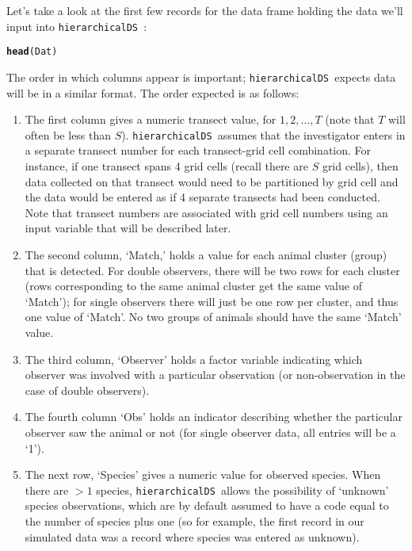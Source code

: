 \documentclass{article}\usepackage{graphicx, color}
\makeatletter
\newcommand{\hlfunctioncall}[1]{\textcolor[rgb]{0.501960784313725,0,0.329411764705882}{\textbf{#1}}}%
\newenvironment{kframe}{%
 \def\at@end@of@kframe{}%
 \ifinner\ifhmode%
  \def\at@end@of@kframe{\end{minipage}}%
  \begin{minipage}{\columnwidth}%
 \fi\fi%
 \def\FrameCommand##1{\hskip\@totalleftmargin \hskip-\fboxsep
 \colorbox{shadecolor}{##1}\hskip-\fboxsep
     \hskip-\linewidth \hskip-\@totalleftmargin \hskip\columnwidth}%
 \MakeFramed {\advance\hsize-\width
   \@totalleftmargin\z@ \linewidth\hsize
   \@setminipage}}%
 {\par\unskip\endMakeFramed%
 \at@end@of@kframe}
\newenvironment{knitrout}{}{} %
\newcommand{\hDS}{\texttt{hierarchicalDS }}
\makeatother
\begin{document}
Let's take a look at the first few records for the data frame holding the data
we'll input into \hDS:
\begin{knitrout}
\color{fgcolor}\begin{kframe}
\begin{alltt}
\hlfunctioncall{head}(Dat)
\end{alltt}


{\ttfamily\noindent\bfseries\color{errorcolor}{\#\# Error: object 'Dat' not found}}\end{kframe}
\end{knitrout}


The order in which columns appear is important; \hDS expects data will be in a similar format.  The order expected is as follows:
\begin{enumerate}
\item The first column gives a numeric transect value, for $1,2,\hdots,T$ (note that $T$ will often be less than $S$). \hDS assumes that the investigator enters in a separate transect number for each transect-grid cell combination.  For instance, if one transect spans 4 grid cells (recall there are $S$ grid cells), then data collected on that transect would need to be partitioned by grid cell and the data would be entered as if 4 separate transects had been conducted. Note that transect numbers are associated with grid cell numbers using an input variable that will be described later.  \\
\item The second column, `Match,' holds a value for each animal cluster (group) that is detected.  For double observers, there will be two rows for each cluster (rows corresponding to the same animal cluster get the same value of `Match'); for single observers there will just be one row per cluster, and thus one value of `Match'.  No two groups of animals should have the same `Match' value.  \\
\item The third column, `Observer' holds a factor variable indicating which observer was involved with a particular observation (or non-observation in the case of double observers).  \\
\item The fourth column `Obs' holds an indicator describing whether the particular observer saw the animal or not (for single observer data, all entries will be a `1').  \\
\item The next row, `Species' gives a numeric value for observed species.  When there are $>1$ species, \hDS allows the possibility of `unknown' species observations, which are by default assumed to have a code equal to the number of species plus one (so for example, the first record in our simulated data was a record where species was entered as unknown). \\ 

\end{enumerate}
\end{document}

